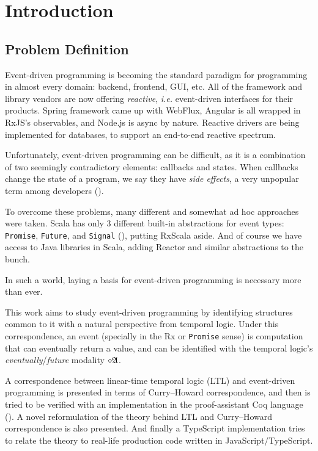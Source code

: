 \chapter{Introduction}\label{chap:introduction}

\section{Problem Definition}

Event-driven programming is becoming the standard paradigm for programming in almost every domain: backend, frontend, GUI, etc. All of the framework and library vendors are now offering \textit{reactive}, \textit{i.e.} event-driven interfaces for their products. Spring framework came up with WebFlux, Angular is all wrapped in RxJS's observables, and Node.js is async by nature. Reactive drivers are being implemented for databases, to support an end-to-end reactive spectrum.

Unfortunately, event-driven programming can be difficult, as it is a combination of two seemingly contradictory elements: callbacks and states. When callbacks change the state of a program, we say they have \textit{side effects}, a very unpopular term among developers (\cite{aerabi_2020}).

To overcome these problems, many different and somewhat ad hoc approaches were taken. Scala has only 3 different built-in abstractions for event types: \texttt{Promise}, \texttt{Future}, and \texttt{Signal} (\cite{deprecating2010}), putting RxScala aside. And of course we have access to Java libraries in Scala, adding Reactor and similar abstractions to the bunch.

In such a world, laying a basis for event-driven programming is necessary more than ever.

This work aims to study event-driven programming by identifying structures common to it with a natural perspective from temporal logic. Under this correspondence, an event (specially in the Rx or \texttt{Promise} sense) is computation that can eventually return a value, and can be identified with the temporal logic's \textit{eventually}/\textit{future} modality $\diamond\mathfrak{A}$.

A correspondence between linear-time temporal logic (LTL) and event-driven programming is presented in terms of Curry--Howard correspondence, and then is tried to be verified with an implementation in the proof-assistant Coq language (\cite{mohammad_ali_a_rabi_2021_4749276}). A novel reformulation of the theory behind LTL and Curry--Howard correspondence is also presented. And finally a TypeScript implementation tries to relate the theory to real-life production code written in JavaScript/TypeScript.

